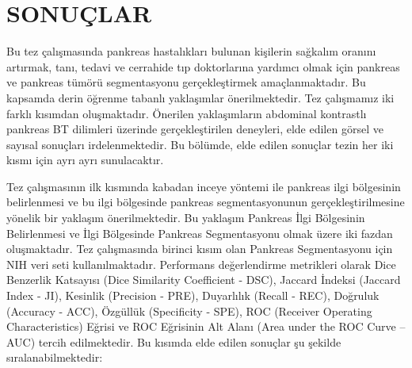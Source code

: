 \chapter{SONUÇLAR \label{sec:Sonuclar2}}

Bu tez çalışmasında pankreas hastalıkları bulunan kişilerin sağkalım oranını artırmak, tanı, tedavi ve cerrahide tıp doktorlarına yardımcı olmak için pankreas ve pankreas tümörü segmentasyonu gerçekleştirmek amaçlanmaktadır. Bu kapsamda derin öğrenme tabanlı yaklaşımlar önerilmektedir. Tez çalışmamız iki farklı kısımdan oluşmaktadır. Önerilen yaklaşımların abdominal kontrastlı pankreas BT dilimleri üzerinde gerçekleştirilen deneyleri, elde edilen görsel ve sayısal sonuçları irdelenmektedir. Bu bölümde, elde edilen sonuçlar tezin her iki kısmı için ayrı ayrı sunulacaktır. 

Tez çalışmasının ilk kısmında kabadan inceye yöntemi ile pankreas ilgi bölgesinin belirlenmesi ve bu ilgi bölgesinde pankreas segmentasyonunun gerçekleştirilmesine yönelik bir yaklaşım önerilmektedir. Bu yaklaşım Pankreas İlgi Bölgesinin Belirlenmesi ve İlgi Bölgesinde Pankreas Segmentasyonu olmak üzere iki fazdan oluşmaktadır. Tez çalışmasında birinci kısım olan Pankreas Segmentasyonu için NIH veri seti kullanılmaktadır. Performans değerlendirme metrikleri olarak Dice Benzerlik Katsayısı (Dice Similarity Coefficient - DSC), Jaccard İndeksi (Jaccard Index - JI), Kesinlik (Precision - PRE), Duyarlılık (Recall - REC), Doğruluk (Accuracy - ACC), Özgüllük (Specificity - SPE), ROC (Receiver Operating Characteristics) Eğrisi ve ROC Eğrisinin Alt Alanı (Area under the ROC Curve – AUC) tercih edilmektedir. Bu kısımda elde edilen sonuçlar şu şekilde sıralanabilmektedir:

